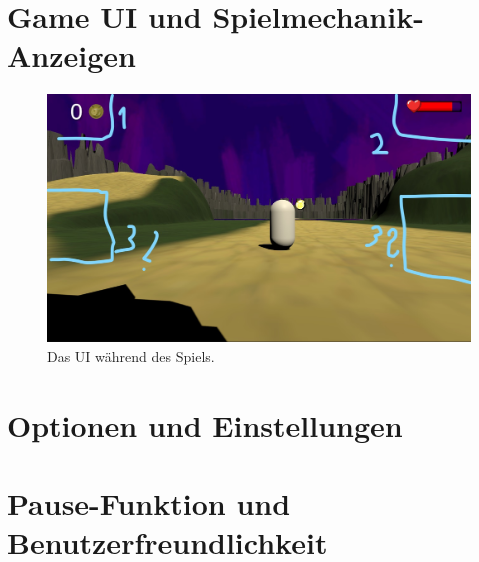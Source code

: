 \section{Game UI und Spielmechanik-Anzeigen}

\begin{figure}[H]
    \centering
    \includegraphics[width=1\textwidth]{chapters/03/images/InkedGameUI.jpg}
    \caption{Das UI während des Spiels.}
    \label{htl03}
\end{figure}

\section{Optionen und Einstellungen}
\section{Pause-Funktion und Benutzerfreundlichkeit}